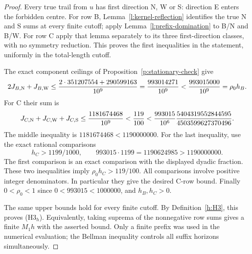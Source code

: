 \begin{proof}
Every true trail from \(u\) has first direction N, W or S: direction
E enters the forbidden centre. For row B,
Lemma~\ref{l:kernel-reflection} identifies the true N and S sums
at every finite cutoff; apply Lemma~\ref{l:prefix-domination}
to B/N and B/W. For row C apply that lemma separately to its
three first-direction classes, with no symmetry reduction.
This proves the first inequalities in the statement, uniformly in
the total-length cutoff.

The exact component ceilings of Proposition~\ref{p:stationary-check}
give
\[
 2J_{B,{\rm N}}+J_{B,{\rm W}}
 \le\frac{2\cdot351207554+290599163}{10^9}
 =\frac{993014271}{10^9}
 <\frac{993015000}{10^9}=\rho_0h_B.
\]
For C their sum is
\[
 J_{C,{\rm N}}+J_{C,{\rm W}}+J_{C,{\rm S}}
 \le\frac{1181674468}{10^9}
 <\frac{119}{100}
 <\frac{993015}{10^6}
             \frac{5404319552844595}{4503599627370496}.
\]
The middle inequality is \(1181674468<1190000000\).
For the last inequality, use the exact rational comparisons
\[
 h_C>1199/1000,\qquad
 993015\cdot1199=1190624985>1190000000.
\]
The first comparison is an exact comparison with the displayed
dyadic fraction. These two inequalities imply
\(\rho_0h_C>119/100\). All comparisons involve positive integer
denominators. In particular they give the desired C-row bound.
Finally \(0<\rho_0<1\) since \(0<993015<1000000\), and
\(h_B,h_C>0\).

The same upper bounds hold for every finite cutoff. By
Definition~\ref{h:H3}, this proves (H3\(_h\)). Equivalently, taking
suprema of the nonnegative row sums gives a finite \(M_1h\)
with the asserted bound. Only a finite prefix was used in the
numerical evaluation; the Bellman inequality controls all suffix
horizons simultaneously.
\end{proof}

